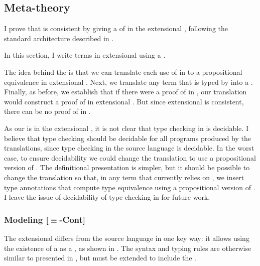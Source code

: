 \subsection{Meta-theory}
\label{sec:cps:consistent}
I prove that \cpstlang is consistent by giving a  of \cpstlang in
the extensional , following the standard architecture described in
.

\begin{typographical}
  In this section, I write terms in extensional  using a
  .
\end{typographical}

The idea behind the  is that we can translate each use of
 in \cpstlang to a propositional
equivalence in extensional .
Next, we translate any term that is typed by  into a
.
Finally, as before, we establish that if there were a proof of \im{\tFalse}
in \cpstlang, our translation would construct a proof of \im{\ccFalse} in
extensional .
But since extensional  is consistent, there can be no proof of
\im{\tFalse} in \cpstlang.

As our  is in the extensional , it is not clear that type
checking in \cpstlang is decidable.
I believe that type checking should be decidable for all programs produced by
the  translations, since type checking in the source language
\cpsslang is decidable.
In the worst case, to ensure decidability we could change the translation to use
a propositional version of .
The definitional presentation is simpler, but it should be possible to change
the translation so that, in any term that currently relies on
, we insert type annotations that compute
type equivalence using a propositional version of
.
I leave the issue of decidability of type checking in \cpstlang for future
work.

\subsubsection{Modeling {[$\equiv$-Cont]}}
\FigCCConv
The extensional  differs from the source language \cpsslang in one key
way: it allows using the existence of a  as
a , as shown in .
The syntax and typing rules are otherwise similar to \cpsslang presented in
, but must be extended to include the .

